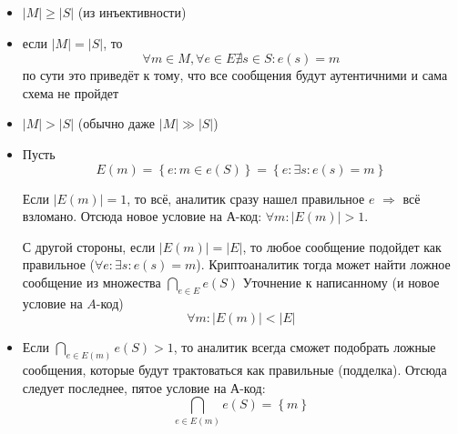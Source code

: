 \begin{itemize}
  \item
    $\left|M\right|{\geq}\left|S\right|$ (из инъективности)
  \item 
    если $\left|M\right|=\left|S\right|$, то 
    \begin{equation*}
      {\forall}m{\in}M,{\forall}e{\in}E{\nexists}s{\in}S:e\left(s\right)=m
    \end{equation*}
    по сути это приведёт к тому, что все сообщения будут аутентичними и
    сама схема не пройдет
  \item
    $\left|M\right|>\left|S\right|$ (обычно даже
    $\left|M\right|{\gg}\left|S\right|$)
  \item
    Пусть
    \begin{equation*}
      E\left( m \right)
      = \left\{e:m{\in}e\left(S\right)\right\}
      =\left\{e:{\exists}s:e\left(s\right)
      =m\right\}
    \end{equation*}

    Если  $\left|E(m)\right|=1$, то всё, аналитик сразу нашел правильное $e$
    $\Rightarrow $ всё взломано.
    Отсюда новое условие на А-код: 
    ${\forall}m:\left|E\left(m\right)\right|>1$.

    С другой стороны, если  $\left|E\left(m\right)\right|=\left|E\right|$,
    то любое сообщение подойдет как правильное
    (${\forall}e:{\exists}s:e\left(s\right)=m$).
    Криптоаналитик тогда может найти ложное сообщение из множества
    $\bigcap\limits_{e{\in}E}e\left( S \right)$ 
    Уточнение к написанному (и новое условие на $A$-код) 
    \begin{equation*}
      {\forall}m:\left|E\left( m \right)\right|<\left|E\right|
    \end{equation*}
  \item
    Если $\bigcap\limits_{e{\in}E\left( m \right)} e\left( S \right) > 1$,
    то аналитик всегда сможет подобрать ложные сообщения, которые будут
    трактоваться как правильные (подделка).
    Отсюда следует последнее, пятое условие на А-код:
    \begin{equation*}
      \bigcap\limits_{e{\in}E\left( m \right)}e\left( S \right)
      = \left\{ m \right\}
    \end{equation*}
\end{itemize}

